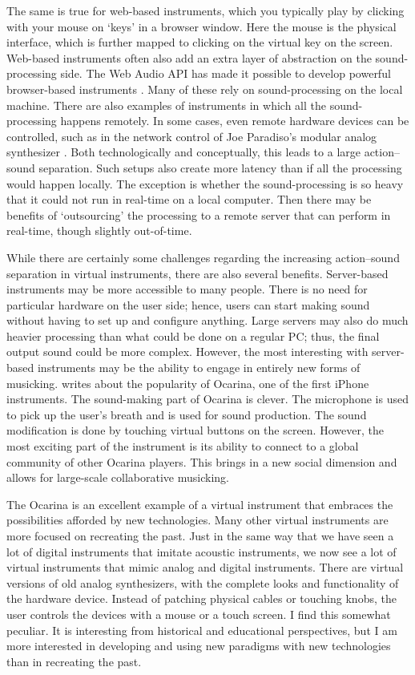 The same is true for web-based instruments, which you typically play by clicking with your mouse on `keys' in a browser window. Here the mouse is the physical interface, which is further mapped to clicking on the virtual key on the screen. Web-based instruments often also add an extra layer of abstraction on the sound-processing side. The Web Audio API has made it possible to develop powerful browser-based instruments \citep{smus_web_2013}. Many of these rely on sound-processing on the local machine. There are also examples of instruments in which all the sound-processing happens remotely. In some cases, even remote hardware devices can be controlled, such as in the network control of Joe Paradiso's modular analog synthesizer \citep{mayton_patchwork:_2012}. Both technologically and conceptually, this leads to a large action--sound separation. Such setups also create more latency than if all the processing would happen locally. The exception is whether the sound-processing is so heavy that it could not run in real-time on a local computer. Then there may be benefits of `outsourcing' the processing to a remote server that can perform in real-time, though slightly out-of-time.

While there are certainly some challenges regarding the increasing action--sound separation in virtual instruments, there are also several benefits. Server-based instruments may be more accessible to many people. There is no need for particular hardware on the user side; hence, users can start making sound without having to set up and configure anything. Large servers may also do much heavier processing than what could be done on a regular PC; thus, the final output sound could be more complex. However, the most interesting with server-based instruments may be the ability to engage in entirely new forms of musicking. \citet{wang_artful_2018} writes about the popularity of Ocarina, one of the first iPhone instruments. The sound-making part of Ocarina is clever. The microphone is used to pick up the user's breath and is used for sound production. The sound modification is done by touching virtual buttons on the screen. However, the most exciting part of the instrument is its ability to connect to a global community of other Ocarina players. This brings in a new social dimension and allows for large-scale collaborative musicking.

The Ocarina is an excellent example of a virtual instrument that embraces the possibilities afforded by new technologies. Many other virtual instruments are more focused on recreating the past. Just in the same way that we have seen a lot of digital instruments that imitate acoustic instruments, we now see a lot of virtual instruments that mimic analog and digital instruments. There are virtual versions of old analog synthesizers, with the complete looks and functionality of the hardware device. Instead of patching physical cables or touching knobs, the user controls the devices with a mouse or a touch screen. I find this somewhat peculiar. It is interesting from historical and educational perspectives, but I am more interested in developing and using new paradigms with new technologies than in recreating the past.

